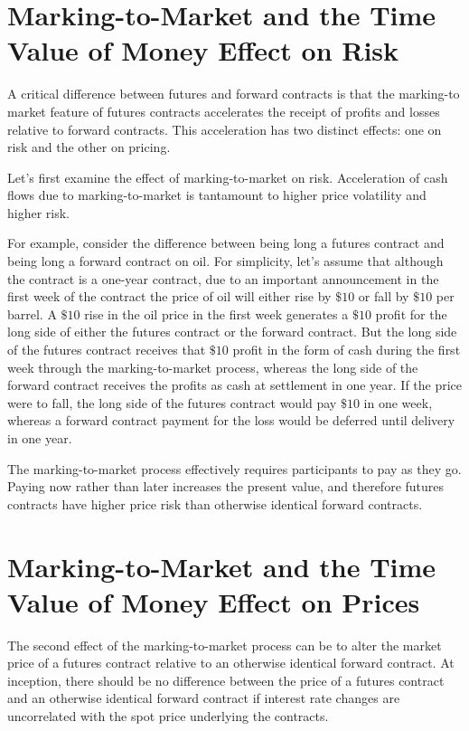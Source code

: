 \documentclass[11pt]{article}
\begin{document}
\section*{Marking-to-Market and the Time Value of Money Effect on Risk}
A critical difference between futures and forward contracts is that the marking-to market feature of futures contracts accelerates the receipt of profits and losses relative to forward contracts. This acceleration has two distinct effects: one on risk and the other on pricing.

Let's first examine the effect of marking-to-market on risk. Acceleration of cash flows due to marking-to-market is tantamount to higher price volatility and higher risk.

For example, consider the difference between being long a futures contract and being long a forward contract on oil. For simplicity, let's assume that although the contract is a one-year contract, due to an important announcement in the first week of the contract the price of oil will either rise by $\$ 10$ or fall by $\$ 10$ per barrel. A $\$ 10$ rise in the oil price in the first week generates a $\$ 10$ profit for the long side of either the futures contract or the forward contract. But the long side of the futures contract receives that $\$ 10$ profit in the form of cash during the first week through the marking-to-market process, whereas the long side of the forward contract receives the profits as cash at settlement in one year. If the price were to fall, the long side of the futures contract would pay $\$ 10$ in one week, whereas a forward contract payment for the loss would be deferred until delivery in one year.

The marking-to-market process effectively requires participants to pay as they go. Paying now rather than later increases the present value, and therefore futures contracts have higher price risk than otherwise identical forward contracts.

\section*{Marking-to-Market and the Time Value of Money Effect on Prices}
The second effect of the marking-to-market process can be to alter the market price of a futures contract relative to an otherwise identical forward contract. At inception, there should be no difference between the price of a futures contract and an otherwise identical forward contract if interest rate changes are uncorrelated with the spot price underlying the contracts.
\end{document}
